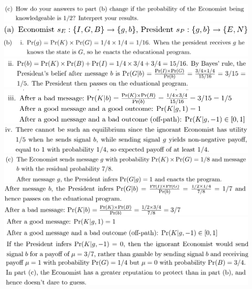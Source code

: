\documentclass[8pt,landscape]{extarticle}
\begin{document}
\begin{multicols*}{3}
    \includegraphics[width=0.75\linewidth,keepaspectratio]{Screenshots/Screenshot 2024-03-11 170915.png}
    \includegraphics[width=0.59\linewidth,keepaspectratio]{Screenshots/Screenshot 2024-03-11 170924.png}
    \includegraphics[width=0.74\linewidth,keepaspectratio]{Screenshots/Screenshot 2024-03-11 170928.png}
    \includegraphics[width=0.71\linewidth,keepaspectratio]{Screenshots/Screenshot 2024-03-11 170932.png}
    \includegraphics[width=0.66\linewidth,keepaspectratio]{Screenshots/Screenshot 2024-03-11 170936.png}
    \includegraphics[width=0.7\linewidth,keepaspectratio]{Screenshots/Screenshot 2024-03-11 170944.png}
    \includegraphics[width=0.74\linewidth,keepaspectratio]{Screenshots/Screenshot 2024-03-11 170951.png}
    \includegraphics[width=0.71\linewidth,keepaspectratio]{Screenshots/Screenshot 2024-03-11 171006.png}
    \includegraphics[width=0.7\linewidth,keepaspectratio]{Screenshots/Screenshot 2024-03-11 171025.png}
    \includegraphics[width=0.71\linewidth,keepaspectratio]{Screenshots/Screenshot 2024-03-11 171028.png}

\end{multicols*}
\end{document}
